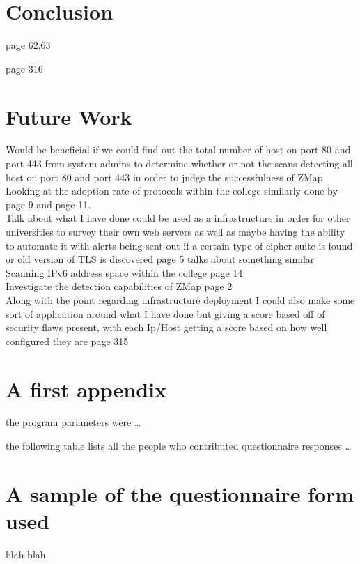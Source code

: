 \documentclass[a4wide,leqno,12pt]{report}
\begin{document}
\chapter{Conclusion}
\cite{turner2014transport} page 62,63

\cite{mendes2008assessing} page 316
\chapter{Future Work}
Would be beneficial if we could find out the total number of host on port 80 and port 443 from system admins to determine whether or not the scans detecting all host on port 80 and port 443 in order to judge the successfulness of ZMap\\

Looking at the adoption rate of protocols within the college similarly done by \cite{durumeric2013zmap} page 9 and \cite{durumeric2013analysis} page 11.\\

Talk about what I have done could be used as a infrastructure in order for other universities to survey their own web servers as well as maybe having the ability to automate it with alerts being sent out if a certain type of cipher suite is found or old version of TLS is discovered\cite{durumeric2015search} page 5 talks about something similar\\

Scanning IPv6 address space within the college \cite{durumeric2013zmap} page 14\\

Investigate the detection capabilities of ZMap \cite{lee2003detection} page 2\\


Along with the point regarding infrastructure deployment I could also make some sort of application around what I have done but giving a score based off of security flaws present, with each Ip/Host getting a score based on how well configured they are \cite{mendes2008assessing} page 315





\appendix
\chapter{A first appendix}

the program parameters were \ldots

the following table lists all the people who contributed questionnaire responses \ldots

\chapter{A sample of the questionnaire form used}

blah blah
\end{document}

